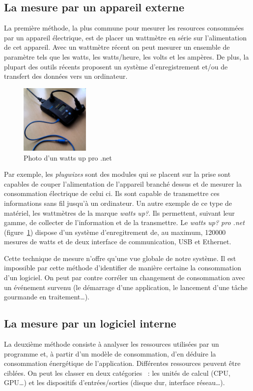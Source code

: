 \documentclass[a4paper, 11pt]{report}
\begin{document}
			\subsection{La mesure par un appareil externe}
La première méthode, la plus commune pour mesurer les resources consommées par un appareil électrique, est de placer un wattmètre en série sur l'alimentation de cet appareil. Avec un wattmètre récent on peut mesurer un ensemble de paramètre tels que les watts, les watts/heure, les volts et les ampères. De plus, la plupart des outils récents proposent un système d'enregistrement et/ou de transfert des données vers un ordinateur.

\begin{figure}
		\includegraphics[width=0.3\textwidth]{figures/wattsUp}
		\caption{Photo d'un watts up pro .net}
		\label{wattsUp}
\end{figure}

Par exemple, les \textit{plugwizes} sont des modules qui se placent sur la prise sont capables de couper l'alimentation de l'appareil branché dessus et de mesurer la consommation électrique de celui ci. Ils sont capable de transmettre ces informations sans fil jusqu'à un ordinateur. Un autre exemple de ce type de matériel, les wattmètres de la marque \textit{watts up\/?}. Ils permettent, suivant leur gamme, de collecter de l'information et de la transmettre. Le \textit{watts up\/? pro .net} (figure~\ref{wattsUp}) dispose d'un système d'enregitrement de, au maximum, 120000 mesures de watts et de deux interface de communication, USB et Ethernet.

Cette technique de mesure n'offre qu'une vue globale de notre système. Il est impossible par cette méthode d'identifier de manière certaine la consommation d'un logiciel. On peut par contre corréler un changement de consommation avec un événement survenu\cite{GreenMining} (le démarrage d'une application, le lancement d'une tâche gourmande en traitement\ldots). 

			\subsection{La mesure par un logiciel interne}
La deuxième méthode consiste à analyser les ressources utilisées par un programme et, à partir d'un modèle de consommation, d'en déduire la consommation énergétique de l'application\cite{da2010methodology}. Différentes ressources peuvent être ciblées. On peut les classer en deux catégories ~: les unités de calcul (CPU, GPU\ldots) et les dispositifs d'entrées/sorties (disque dur, interface réseau\ldots).
\end{document}
